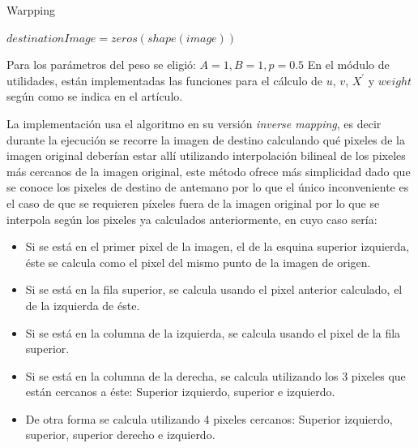 \documentclass[conference]{IEEEtran}
\begin{document}
	\begin{algorithm}[ht]
		\caption{Warpping}	
		\DontPrintSemicolon
	$destinationImage = zeros(shape(image)) $ \;
		\label{asdf}
		\end{algorithm} 

		Para los parámetros del peso se eligió: $A = 1, B = 1, p= 0.5$
		En el módulo de utilidades, están implementadas las funciones para el cálculo de $u$, $v$, $X^\prime$ y $weight$ según como se indica en el artículo.
	
	La implementación usa el algoritmo en su versión \textit{inverse mapping}, es decir durante la ejecución se recorre la imagen de destino calculando qué pixeles de la imagen original deberían estar allí utilizando interpolación bilineal de los pixeles más cercanos de la imagen original, este método ofrece más simplicidad dado que se conoce los pixeles de destino de antemano por lo que el único inconveniente es el caso de que se requieren píxeles fuera de la imagen original por lo que se interpola según los pixeles ya calculados anteriormente, en cuyo caso sería:
		\begin{itemize}
               	\item Si se está en el primer pixel de la imagen, el de la esquina superior izquierda, éste se calcula como el pixel del mismo punto de la imagen de origen.
               	\item Si se está en la fila superior, se calcula usando el pixel anterior calculado, el de la izquierda de éste.
               	\item Si se está en la columna de la izquierda, se calcula usando el pixel de la fila superior.
               	\item Si se está en la columna de la derecha, se calcula utilizando los 3 pixeles que están cercanos a éste: Superior izquierdo, superior e izquierdo.
               	\item De otra forma se calcula utilizando 4 pixeles cercanos: Superior izquierdo, superior, superior derecho e izquierdo.
		\end{itemize}
	
\end{document}
